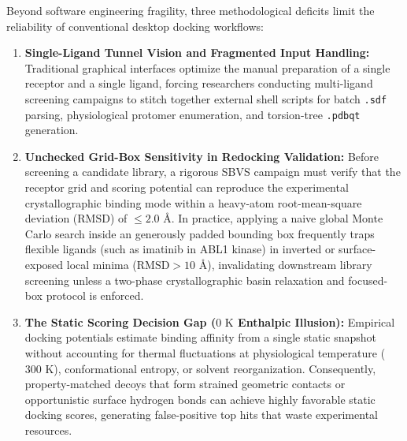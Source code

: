 \documentclass[11pt,a4paper]{article}
\begin{document}
Beyond software engineering fragility, three methodological deficits limit the reliability of conventional desktop docking workflows:
\begin{enumerate}
  \setlength{\itemsep}{3pt}
  \setlength{\parskip}{0pt}
  \item \textbf{Single-Ligand Tunnel Vision and Fragmented Input Handling:} Traditional graphical interfaces optimize the manual preparation of a single receptor and a single ligand, forcing researchers conducting multi-ligand screening campaigns to stitch together external shell scripts for batch \texttt{.sdf} parsing, physiological protomer enumeration, and torsion-tree \texttt{.pdbqt} generation.
  \item \textbf{Unchecked Grid-Box Sensitivity in Redocking Validation:} Before screening a candidate library, a rigorous SBVS campaign must verify that the receptor grid and scoring potential can reproduce the experimental crystallographic binding mode within a heavy-atom root-mean-square deviation ($\text{RMSD}$) of $\le 2.0\text{ \AA}$. In practice, applying a naive global Monte Carlo search inside an generously padded bounding box frequently traps flexible ligands (such as imatinib in ABL1 kinase) in inverted or surface-exposed local minima ($\text{RMSD} > 10\text{ \AA}$), invalidating downstream library screening unless a two-phase crystallographic basin relaxation and focused-box protocol is enforced.
  \item \textbf{The Static Scoring Decision Gap ($0\text{ K}$ Enthalpic Illusion):} Empirical docking potentials estimate binding affinity from a single static snapshot without accounting for thermal fluctuations at physiological temperature ($300\text{ K}$), conformational entropy, or solvent reorganization. Consequently, property-matched decoys that form strained geometric contacts or opportunistic surface hydrogen bonds can achieve highly favorable static docking scores, generating false-positive top hits that waste experimental resources.
\end{enumerate}
\end{document}
